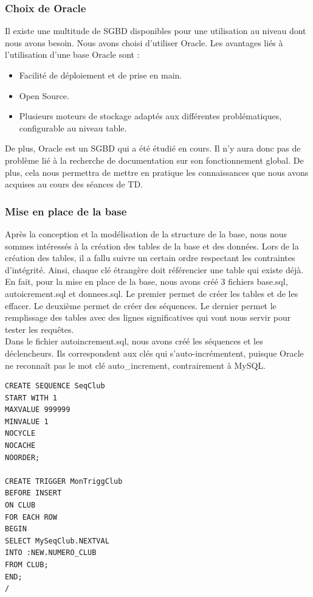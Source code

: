 \documentclass{article}
\begin{document}
\subsubsection*{Choix de Oracle}
Il existe une multitude de SGBD disponibles pour une utilisation au niveau dont nous avons besoin. Nous avons choisi d'utiliser Oracle. Les avantages liés à l'utilisation d'une base Oracle sont :
\begin{itemize}
\item Facilité de déploiement et de prise en main.
\item Open Source.
\item Plusieurs moteurs de stockage adaptés aux différentes problématiques, configurable au niveau table. 
\end{itemize}

De plus, Oracle est un SGBD qui a été étudié en cours. Il n'y aura donc pas de problème lié à la recherche de documentation sur son fonctionnement global. De plus, cela nous permettra de mettre en pratique les connaissances que nous avons acquises au cours des séances de TD.

\subsubsection*{Mise en place de la base}
Après la conception et la modélisation de la structure de la base, nous nous sommes intéressés à la création des tables de la base et des données. 
Lors de la création des tables, il a fallu suivre un certain ordre respectant les contraintes d'intégrité. Ainsi, chaque clé étrangère doit référencier une table qui existe déjà. En fait, pour la mise en place de la base, nous avons créé 3 fichiers base.sql, autoicrement.sql et donnees.sql. Le premier permet de créer les tables et de les effacer. Le deuxième permet de créer des séquences. Le dernier permet le remplissage des tables avec des lignes significatives qui vont nous servir pour tester les requêtes. \\

Dans le fichier autoincrement.sql, nous avons créé les séquences et les déclencheurs. Ils correspondent aux clés qui s'auto-incrémentent, puisque Oracle ne reconnaît pas le mot clé auto\_increment, contrairement à MySQL. 


\begin{verbatim}
CREATE SEQUENCE SeqClub
START WITH 1
MAXVALUE 999999
MINVALUE 1
NOCYCLE
NOCACHE
NOORDER;

CREATE TRIGGER MonTriggClub
BEFORE INSERT
ON CLUB
FOR EACH ROW
BEGIN
SELECT MySeqClub.NEXTVAL
INTO :NEW.NUMERO_CLUB
FROM CLUB;
END;
/
\end{verbatim}
\end{document}
